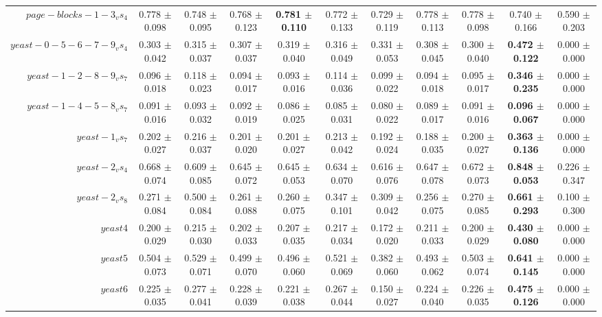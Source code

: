 \begin{table}[!ht]
{\begin{tabular}{r c c c c c c c c c c}
$page-blocks-1-3_vs_4$ & 0.778 $\pm$ 0.098 & 0.748 $\pm$ 0.095 & 0.768 $\pm$ 0.123 & \textbf{0.781 $\pm$ 0.110} & 0.772 $\pm$ 0.133 & 0.729 $\pm$ 0.119 & 0.778 $\pm$ 0.113 & 0.778 $\pm$ 0.098 & 0.740 $\pm$ 0.166 & 0.590 $\pm$ 0.203 \\
$yeast-0-5-6-7-9_vs_4$ & 0.303 $\pm$ 0.042 & 0.315 $\pm$ 0.037 & 0.307 $\pm$ 0.037 & 0.319 $\pm$ 0.040 & 0.316 $\pm$ 0.049 & 0.331 $\pm$ 0.053 & 0.308 $\pm$ 0.045 & 0.300 $\pm$ 0.040 & \textbf{0.472 $\pm$ 0.122} & 0.000 $\pm$ 0.000 \\
$yeast-1-2-8-9_vs_7$ & 0.096 $\pm$ 0.018 & 0.118 $\pm$ 0.023 & 0.094 $\pm$ 0.017 & 0.093 $\pm$ 0.016 & 0.114 $\pm$ 0.036 & 0.099 $\pm$ 0.022 & 0.094 $\pm$ 0.018 & 0.095 $\pm$ 0.017 & \textbf{0.346 $\pm$ 0.235} & 0.000 $\pm$ 0.000 \\
$yeast-1-4-5-8_vs_7$ & 0.091 $\pm$ 0.016 & 0.093 $\pm$ 0.032 & 0.092 $\pm$ 0.019 & 0.086 $\pm$ 0.025 & 0.085 $\pm$ 0.031 & 0.080 $\pm$ 0.022 & 0.089 $\pm$ 0.017 & 0.091 $\pm$ 0.016 & \textbf{0.096 $\pm$ 0.067} & 0.000 $\pm$ 0.000 \\
$yeast-1_vs_7$ & 0.202 $\pm$ 0.027 & 0.216 $\pm$ 0.037 & 0.201 $\pm$ 0.020 & 0.201 $\pm$ 0.027 & 0.213 $\pm$ 0.042 & 0.192 $\pm$ 0.024 & 0.188 $\pm$ 0.035 & 0.200 $\pm$ 0.027 & \textbf{0.363 $\pm$ 0.136} & 0.000 $\pm$ 0.000 \\
$yeast-2_vs_4$ & 0.668 $\pm$ 0.074 & 0.609 $\pm$ 0.085 & 0.645 $\pm$ 0.072 & 0.645 $\pm$ 0.053 & 0.634 $\pm$ 0.070 & 0.616 $\pm$ 0.076 & 0.647 $\pm$ 0.078 & 0.672 $\pm$ 0.073 & \textbf{0.848 $\pm$ 0.053} & 0.226 $\pm$ 0.347 \\
$yeast-2_vs_8$ & 0.271 $\pm$ 0.084 & 0.500 $\pm$ 0.084 & 0.261 $\pm$ 0.088 & 0.260 $\pm$ 0.075 & 0.347 $\pm$ 0.101 & 0.309 $\pm$ 0.042 & 0.256 $\pm$ 0.075 & 0.270 $\pm$ 0.085 & \textbf{0.661 $\pm$ 0.293} & 0.100 $\pm$ 0.300 \\
$yeast4$ & 0.200 $\pm$ 0.029 & 0.215 $\pm$ 0.030 & 0.202 $\pm$ 0.033 & 0.207 $\pm$ 0.035 & 0.217 $\pm$ 0.034 & 0.172 $\pm$ 0.020 & 0.211 $\pm$ 0.033 & 0.200 $\pm$ 0.029 & \textbf{0.430 $\pm$ 0.080} & 0.000 $\pm$ 0.000 \\
$yeast5$ & 0.504 $\pm$ 0.073 & 0.529 $\pm$ 0.071 & 0.499 $\pm$ 0.070 & 0.496 $\pm$ 0.060 & 0.521 $\pm$ 0.069 & 0.382 $\pm$ 0.060 & 0.493 $\pm$ 0.062 & 0.503 $\pm$ 0.074 & \textbf{0.641 $\pm$ 0.145} & 0.000 $\pm$ 0.000 \\
$yeast6$ & 0.225 $\pm$ 0.035 & 0.277 $\pm$ 0.041 & 0.228 $\pm$ 0.039 & 0.221 $\pm$ 0.038 & 0.267 $\pm$ 0.044 & 0.150 $\pm$ 0.027 & 0.224 $\pm$ 0.040 & 0.226 $\pm$ 0.035 & \textbf{0.475 $\pm$ 0.126} & 0.000 $\pm$ 0.000 \\

\end{tabular}}
\end{table}
